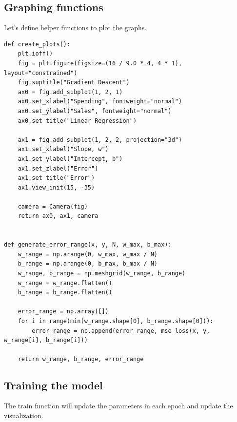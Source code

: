 \documentclass[openany]{book}
\begin{document}
    \subsection{Graphing functions}\label{graphing-functions}

Let's define helper functions to plot the graphs.

\begin{tcolorbox}
\tiny
\begin{verbatim}
def create_plots():
    plt.ioff()
    fig = plt.figure(figsize=(16 / 9.0 * 4, 4 * 1), layout="constrained")
    fig.suptitle("Gradient Descent")
    ax0 = fig.add_subplot(1, 2, 1)
    ax0.set_xlabel("Spending", fontweight="normal")
    ax0.set_ylabel("Sales", fontweight="normal")
    ax0.set_title("Linear Regression")

    ax1 = fig.add_subplot(1, 2, 2, projection="3d")
    ax1.set_xlabel("Slope, w")
    ax1.set_ylabel("Intercept, b")
    ax1.set_zlabel("Error")
    ax1.set_title("Error")
    ax1.view_init(15, -35)

    camera = Camera(fig)
    return ax0, ax1, camera


def generate_error_range(x, y, N, w_max, b_max):
    w_range = np.arange(0, w_max, w_max / N)
    b_range = np.arange(0, b_max, b_max / N)
    w_range, b_range = np.meshgrid(w_range, b_range)
    w_range = w_range.flatten()
    b_range = b_range.flatten()

    error_range = np.array([])
    for i in range(min(w_range.shape[0], b_range.shape[0])):
        error_range = np.append(error_range, mse_loss(x, y, w_range[i], b_range[i]))

    return w_range, b_range, error_range
\end{verbatim}
\end{tcolorbox}

    \subsection{Training the model}\label{training-the-model}

The train function will update the parameters in each epoch and update
the visualization.
\end{document}
